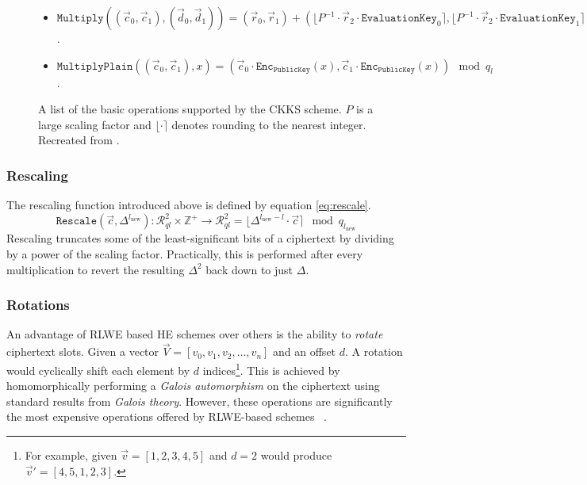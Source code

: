 \begin{figure}[ht]
\begin{tcolorbox}
\begin{itemize}[leftmargin=0.1cm]
            \item $\texttt{Multiply}((\vec{c}_0, \vec{c}_1), (\vec{d}_0, \vec{d}_1)) = (\vec{r}_0, \vec{r}_1) + (\lfloor P^{-1} \cdot \vec{r}_2 \cdot \texttt{EvaluationKey}_0 \rceil, \lfloor P^{-1} \cdot \vec{r}_2 \cdot \texttt{EvaluationKey}_1  \rceil) \mod q_l$.
            \item $\texttt{MultiplyPlain}((\vec{c}_0, \vec{c}_1), x) = (\vec{c}_0 \cdot \texttt{Enc}_\texttt{PublicKey}(x), \vec{c}_1 \cdot \texttt{Enc}_\texttt{PublicKey}(x)) \mod q_l$.
        \end{itemize}
    \end{tcolorbox}
    \caption[CKKS Operations]{A list of the basic operations supported by the CKKS scheme. $P$ is a large scaling factor and $\lfloor \cdot \rceil$ denotes rounding to the nearest integer. Recreated from \cite{CKKS}.}
    \label{fig:ckksOps}
\end{figure}

\setlength{\leftskip}{0cm}
\subsubsection{Rescaling}
\setlength{\leftskip}{0.5cm}
\indent \indent
The rescaling function introduced above is defined by equation \ref{eq:rescale}.
\begin{equation}
    \label{eq:rescale}
    \texttt{Rescale}(\vec{c}, \Delta^{l_\text{new}}) : \mathcal{R}^2_{ql} \times \mathbb{Z}^+ \rightarrow \mathcal{R}^2_{ql} = \lfloor \Delta^{l_\text{new} - l} \cdot \vec{c} \rceil \mod q_{l_\text{new}}
\end{equation}
Rescaling truncates some of the least-significant bits of a ciphertext by dividing by a power of the scaling factor. Practically, this is performed after every multiplication to revert the resulting $\Delta^2$ back down to just $\Delta$.  

\setlength{\leftskip}{0cm}
\subsubsection{Rotations}
\setlength{\leftskip}{0.5cm}
\indent \indent
An advantage of RLWE based HE schemes over others is the ability to \textit{rotate} ciphertext slots. Given a vector $\vec{V} = [v_0, v_1, v_2, \ldots, v_n]$ and an offset $d$. A rotation would cyclically shift each element by $d$ indices\footnote{For example, given $\vec{v} = [1, 2, 3, 4, 5]$ and $d = 2$ would produce $\vec{v}' = [4, 5, 1, 2, 3]$.}. This is achieved by homomorphically performing a \textit{Galois automorphism} on the ciphertext using standard results from \textit{Galois theory}. However, these operations are significantly the most expensive operations offered by RLWE-based schemes ~\cite{RotationBad}.

